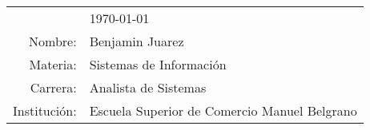 
\hfill
\begin{tabular}{rl @{}}
	$ $ & \today \bigskip\\ %
Nombre:     & Benjamin Juarez  \\
Materia:     & Sistemas de Información  \\
Carrera: & Analista de Sistemas \\
Institución:    & Escuela Superior de Comercio Manuel Belgrano  \\
\end{tabular}
\bigskip %